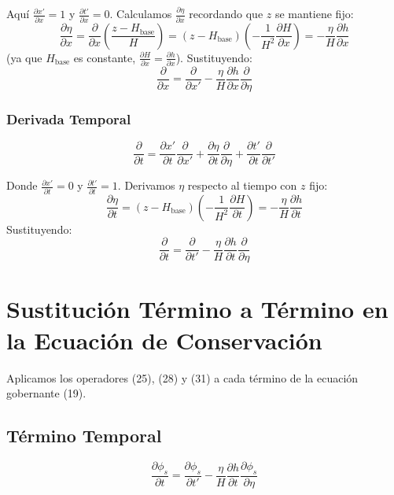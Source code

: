 \documentclass[11pt,a4paper]{article}
\begin{document}
Aquí $\frac{\partial x'}{\partial x} = 1$ y $\frac{\partial t'}{\partial x} = 0$. Calculamos $\frac{\partial \eta}{\partial x}$ recordando que $z$ se mantiene fijo:
\begin{equation}
    \frac{\partial \eta}{\partial x} = \frac{\partial}{\partial x}\left(\frac{z - H_{\text{base}}}{H}\right) = (z - H_{\text{base}})\left(-\frac{1}{H^2}\frac{\partial H}{\partial x}\right) = -\frac{\eta}{H}\frac{\partial h}{\partial x}
\end{equation}
(ya que $H_{\text{base}}$ es constante, $\frac{\partial H}{\partial x} = \frac{\partial h}{\partial x}$). Sustituyendo:
\begin{equation}
    \boxed{\frac{\partial}{\partial x} = \frac{\partial}{\partial x'} - \frac{\eta}{H}\frac{\partial h}{\partial x}\frac{\partial}{\partial \eta}}
\end{equation}

\subsubsection{Derivada Temporal}
\begin{equation}
    \frac{\partial}{\partial t} = \frac{\partial x'}{\partial t}\frac{\partial}{\partial x'} + \frac{\partial \eta}{\partial t}\frac{\partial}{\partial \eta} + \frac{\partial t'}{\partial t}\frac{\partial}{\partial t'}
\end{equation}

Donde $\frac{\partial x'}{\partial t} = 0$ y $\frac{\partial t'}{\partial t} = 1$. Derivamos $\eta$ respecto al tiempo con $z$ fijo:
\begin{equation}
    \frac{\partial \eta}{\partial t} = (z - H_{\text{base}})\left(-\frac{1}{H^2}\frac{\partial H}{\partial t}\right) = -\frac{\eta}{H}\frac{\partial h}{\partial t}
\end{equation}
Sustituyendo:
\begin{equation}
    \boxed{\frac{\partial}{\partial t} = \frac{\partial}{\partial t'} - \frac{\eta}{H}\frac{\partial h}{\partial t}\frac{\partial}{\partial \eta}}
\end{equation}

\section{Sustitución Término a Término en la Ecuación de Conservación}
Aplicamos los operadores (25), (28) y (31) a cada término de la ecuación gobernante (19).

\subsection{Término Temporal}
\begin{equation}
    \frac{\partial \phi_s}{\partial t} = \frac{\partial \phi_s}{\partial t'} - \frac{\eta}{H}\frac{\partial h}{\partial t}\frac{\partial \phi_s}{\partial \eta}
\end{equation}
\end{document}
